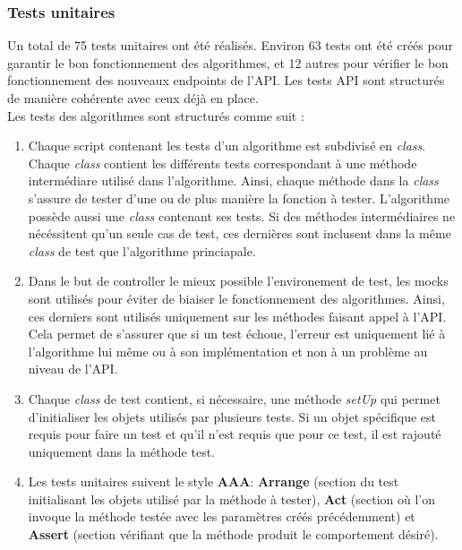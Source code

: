 \documentclass[11pt]{article}
\begin{document}
\subsubsection{Tests unitaires}
Un total de 75 tests unitaires ont été réalisés. Environ 63 tests ont été créés pour garantir le bon fonctionnement des algorithmes, et 12 autres pour vérifier le bon fonctionnement des nouveaux endpoints de l'API. Les tests API sont structurés de manière cohérente avec ceux déjà en place.\\

Les tests des algorithmes sont structurés comme suit :
\begin{enumerate}
	\item Chaque script contenant les tests d'un algorithme est subdivisé en \textit{class}. Chaque \textit{class} contient les différents tests correspondant à une méthode intermédiare utilisé dans l'algorithme. Ainsi, chaque méthode dans la \textit{class} s'assure de tester d'une ou de plus manière la fonction à tester. L'algorithme possède aussi une \textit{class} contenant ses tests. Si des méthodes intermédiaires ne nécéssitent qu'un seule cas de test, ces dernières sont inclusent dans la même \textit{class} de test que l'algorithme princiapale.
	
	\item Dans le but de controller le mieux possible l'environement de test, les mocks sont utilisés pour éviter de biaiser le fonctionnement des algorithmes. Ainsi, ces derniers sont utilisés uniquement sur les méthodes faisant appel à l'API. Cela permet de s'assurer que si un test échoue, l'erreur est uniquement lié à l'algorithme lui même ou à son implémentation et non à un problème au niveau de l'API.
	
	\item Chaque \textit{class} de test contient, si nécessaire, une méthode \textit{setUp} qui permet d'initialiser les objets utilisés par plusieurs tests. Si un objet spécifique est requis pour faire un test et qu'il n'est requis que pour ce test, il est rajouté uniquement dans la méthode test.
	
	\item Les tests unitaires suivent le style \textbf{AAA}: \textbf{Arrange} (section du test initialisant les objets utilisé par la méthode à tester), \textbf{Act} (section où l’on invoque la méthode testée avec les paramètres créés précédemment) et \textbf{Assert} (section vérifiant que la méthode produit le comportement désiré).\\
\end{enumerate}
\end{document}
